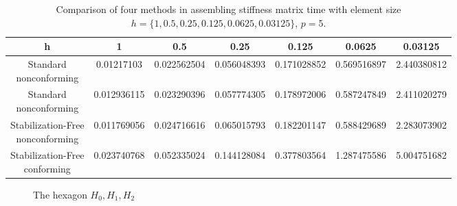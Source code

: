 \documentclass[10pt]{amsart}
\theoremstyle{definition}
\theoremstyle{remark}
\begin{document}
\begin{enumerate}[1.]
\begin{table}
\label{tab:ttime}
\caption{Comparison of four methods in assembling stiffness matrix time with
element size $h=\{1, 0.5, 0.25, 0.125, 0.0625, 0.03125\}$, $p = 5$.}
\begin{tabular}{|c|c|c|c|c|c|c|}
\hline
h & 1 & 0.5 & 0.25 & 0.125 & 0.0625 & 0.03125 \\
\hline
  \thead{Standard\\nonconforming} & 0.01217103 & 0.022562504 & 0.056048393 & 0.171028852 & 0.569516897 & 2.440380812 \\
\hline
  \thead{Standard\\nonconforming} & 0.012936115 & 0.023290396 & 0.057774305 & 0.178972006 & 0.587247849 & 2.411020279 \\
\hline
\thead{Stabilization-Free \\ nonconforming}& 0.011769056 & 0.024716616 & 0.065015793 & 0.182201147 & 0.588429689 & 2.283073902 \\
\hline
\thead{Stabilization-Free \\ conforming} & 0.023740768 & 0.052335024 & 0.144128084 & 0.377803564 & 1.287475586 & 5.004751682 \\
\hline
\end{tabular}
\end{table}

\begin{figure}[h]
\centering
{}
\caption{The hexagon $H_0, H_1, H_2$}
  \label{fig:collapsehexagon} %
\end{figure}


\end{enumerate}
\end{document}
